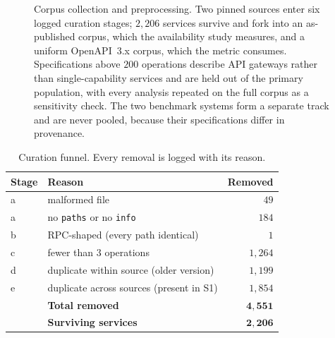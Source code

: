 \documentclass[journal]{IEEEtran}
\newcommand{\code}[1]{\texttt{\small #1}}
\begin{document}
\begin{figure}[!t]
\caption{Corpus collection and preprocessing. Two pinned sources enter six
logged curation stages; $2{,}206$ services survive and fork into an
as-published corpus, which the availability study measures, and a uniform
OpenAPI~3.x corpus, which the metric consumes. Specifications above $200$
operations describe API gateways rather than single-capability services and are
held out of the primary population, with every analysis repeated on the full
corpus as a sensitivity check. The two benchmark systems form a separate track
and are never pooled, because their specifications differ in provenance.}
\label{fig:pipeline}
\end{figure}

\begin{table}[!t]
\caption{Curation funnel. Every removal is logged with its reason.}
\label{tab:funnel}
\centering
\footnotesize
\begin{tabular}{@{}llr@{}}
\toprule
\textbf{Stage} & \textbf{Reason} & \textbf{Removed} \\
\midrule
a & malformed file & $49$ \\
a & no \code{paths} or no \code{info} & $184$ \\
b & RPC-shaped (every path identical) & $1$ \\
c & fewer than $3$ operations & $1{,}264$ \\
d & duplicate within source (older version) & $1{,}199$ \\
e & duplicate across sources (present in S1) & $1{,}854$ \\
\midrule
  & \textbf{Total removed} & $\mathbf{4{,}551}$ \\
  & \textbf{Surviving services} & $\mathbf{2{,}206}$ \\
\bottomrule
\end{tabular}
\end{table}
\end{document}
